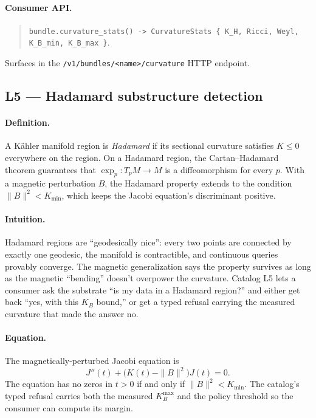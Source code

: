 \documentclass[11pt,letterpaper]{article}
\begin{document}
\paragraph{Consumer API.}
\begin{quote}
\sloppy
\texttt{bundle.curvature\_stats() -> CurvatureStats \{ K\_H,
Ricci, Weyl, K\_B\_min, K\_B\_max \}}.
\end{quote}
Surfaces in the
\texttt{/v1/bundles/<name>/curvature} HTTP endpoint.


\subsection{L5 --- Hadamard substructure detection}

\paragraph{Definition.}
A K\"ahler manifold region is \emph{Hadamard} if its sectional
curvature satisfies $K \leq 0$ everywhere on the region. On a
Hadamard region, the Cartan--Hadamard theorem guarantees that
$\exp_p: T_pM \to M$ is a diffeomorphism for every $p$. With a
magnetic perturbation $B$, the Hadamard property extends to the
condition $\|B\|^2 < K_{\min}$, which keeps the Jacobi equation's
discriminant positive.

\paragraph{Intuition.}
Hadamard regions are ``geodesically nice'': every two points are
connected by exactly one geodesic, the manifold is contractible,
and continuous queries provably converge. The magnetic
generalization says the property survives as long as the magnetic
``bending'' doesn't overpower the curvature. Catalog L5 lets a
consumer ask the substrate ``is my data in a Hadamard region?''
and either get back ``yes, with this $K_B$ bound,'' or get a typed
refusal carrying the measured curvature that made the answer no.

\paragraph{Equation.}
The magnetically-perturbed Jacobi equation is
\[
J''(t) + \bigl( K(t) - \|B\|^2 \bigr) J(t) = 0.
\]
The equation has no zeros in $t > 0$ if and only if $\|B\|^2 <
K_{\min}$. The catalog's typed refusal carries both the measured
$K_B^{\max}$ and the policy threshold so the consumer can compute
its margin.
\end{document}
